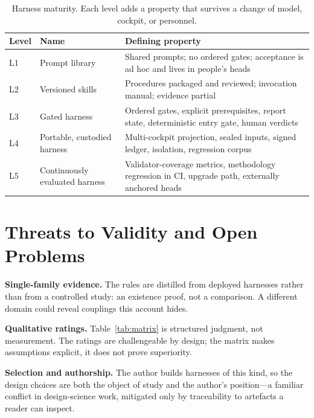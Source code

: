 \documentclass[10pt,a4paper]{article}
\theoremstyle{definition}
\theoremstyle{plain}
\theoremstyle{principle}
\begin{document}
\begin{table}[htbp]
\centering
\caption{Harness maturity. Each level adds a property that survives a change of model, cockpit, or
personnel.}
\label{tab:maturity}
\small
\begin{tabularx}{\textwidth}{@{}p{1.0cm} >{\raggedright\arraybackslash}p{3.3cm} >{\raggedright\arraybackslash}X@{}}
\toprule
\textbf{Level} & \textbf{Name} & \textbf{Defining property} \\
\midrule
L1 & Prompt library & Shared prompts; no ordered gates; acceptance is ad hoc and lives in people's heads \\
L2 & Versioned skills & Procedures packaged and reviewed; invocation manual; evidence partial \\
L3 & Gated harness & Ordered gates, explicit prerequisites, report state, deterministic entry gate, human verdicts \\
L4 & Portable, custodied harness & Multi-cockpit projection, sealed inputs, signed ledger, isolation, regression corpus \\
L5 & Continuously evaluated harness & Validator-coverage metrics, methodology regression in CI, upgrade path, externally anchored heads \\
\bottomrule
\end{tabularx}
\end{table}

\section{Threats to Validity and Open Problems}\label{sec:limits}

\textbf{Single-family evidence.} The rules are distilled from deployed harnesses rather than from
a controlled study: an existence proof, not a comparison. A different domain could reveal couplings
this account hides.

\textbf{Qualitative ratings.} Table~\ref{tab:matrix} is structured judgment, not measurement. The
ratings are challengeable by design; the matrix makes assumptions explicit, it does not prove
superiority.

\textbf{Selection and authorship.} The author builds harnesses of this kind, so the design choices
are both the object of study and the author's position---a familiar conflict in design-science
work, mitigated only by traceability to artefacts a reader can inspect.
\end{document}
